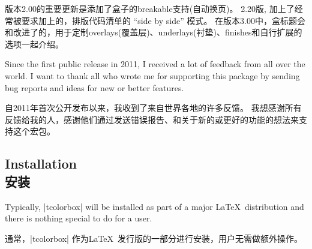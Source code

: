 版本2.00的重要更新是添加了盒子的breakable支持(自动换页)。%
2.20版, 加上了经常被要求加上的，排版代码清单的 \enquote{side by side} 模式。%
在版本3.00中，盒标题会和改进了的，用于定制overlays(覆盖层)、underlays(衬垫)、finishes和自行扩展的选项一起介绍。



\begin{tcolorbox}[enhanced,%
boxrule=0mm,boxsep=0mm,%
frame hidden,interior hidden,%
left=0mm,right=0mm,top=0mm,bottom=0mm,%
watermark opacity=0.25,watermark zoom=1.2,%
before=\par\smallskip,%
clip watermark=false,%
watermark tikz={%
\path[fill=yellow,draw=yellow!75!red] (0,0) circle (1cm);%
\fill[red] (45:5mm) circle (1mm);\fill[red] (135:5mm) circle (1mm);%
\draw[line width=1mm,red] (215:5mm) arc (215:325:5mm);}]%
Since the first public release in 2011, %
I received a lot of feedback from all over the world.%
I want to thank all who wrote me for supporting this package by sending bug reports and ideas for new or better features.

自2011年首次公开发布以来，我收到了来自世界各地的许多反馈。%
我想感谢所有反馈给我的人，感谢他们通过发送错误报告、和关于新的或更好的功能的想法来支持这个宏包。
\end{tcolorbox}
    

\subsection{Installation\\安装}

Typically, |tcolorbox| will be installed as part of a major \LaTeX\ distribution
and there is nothing special to do for a user.


通常，|tcolorbox| 作为\LaTeX\ 发行版的一部分进行安装，用户无需做额外操作。


